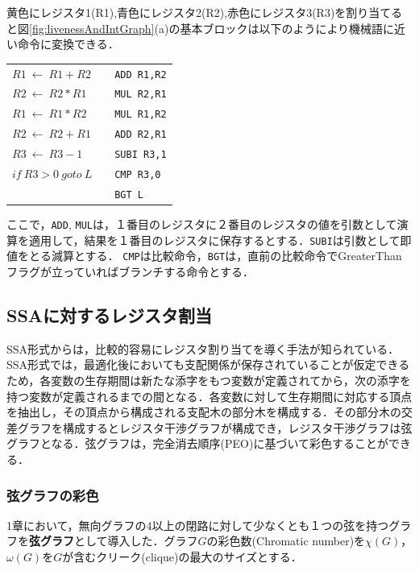 \documentclass[dvipdfmx,a4j]{jbook}
\begin{document}
\begin{Exmp}
黄色にレジスタ1(R1),青色にレジスタ2(R2),赤色にレジスタ3(R3)を割り当てると図\ref{fig:livenessAndIntGraph}(a)の基本ブロックは以下のようにより機械語に近い命令に変換できる．
\begin{center}
\begin{tabular}{lcl}
    $R1\ \leftarrow\ R1+R2$ & \qquad & \verb|ADD R1,R2|\\
    $R2\ \leftarrow\ R2\ast R1$ & & \verb|MUL R2,R1|\\
    $R1\ \leftarrow\ R1\ast R2$ & & \verb|MUL R1,R2|\\
    $R2\ \leftarrow\ R2+R1$ & & \verb|ADD R2,R1|\\
    $R3\ \leftarrow\ R3-1$ & & \verb|SUBI R3,1|\\
    $if\ R3>0\ goto\ L$ & & \verb|CMP R3,0|\\
    & & \verb|BGT L|
\end{tabular}
\end{center}
ここで，\verb|ADD|, \verb|MUL|は，１番目のレジスタに２番目のレジスタの値を引数として演算を適用して，結果を１番目のレジスタに保存するとする．\verb|SUBI|は引数として即値をとる減算とする．
\verb|CMP|は比較命令，\verb|BGT|は，直前の比較命令でGreaterThanフラグが立っていればブランチする命令とする．
\end{Exmp}

\subsection{SSAに対するレジスタ割当}

SSA形式からは，比較的容易にレジスタ割り当てを導く手法が知られている．SSA形式では，最適化後においても支配関係が保存されていることが仮定できるため，各変数の生存期間は新たな添字をもつ変数が定義されてから，次の添字を持つ変数が定義されるまでの間となる．各変数に対して生存期間に対応する頂点を抽出し，その頂点から構成される支配木の部分木を構成する．その部分木の交差グラフを構成するとレジスタ干渉グラフが構成でき，レジスタ干渉グラフは弦グラフとなる．弦グラフは，完全消去順序(PEO)に基づいて彩色することができる．

\subsubsection{弦グラフの彩色}

1章において，無向グラフの4以上の閉路に対して少なくとも１つの弦を持つグラフを{\bf 弦グラフ}として導入した．グラフ$G$の彩色数(Chromatic number)を$\chi(G)$，$\omega(G)$を$G$が含むクリーク(clique)の最大のサイズとする．
\end{document}
